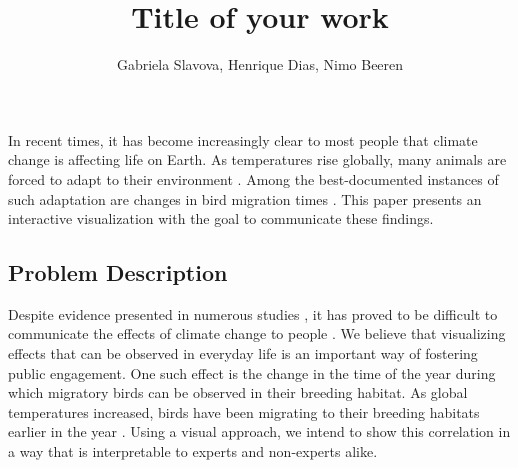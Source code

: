 \documentclass[journal]{vgtc}                %
\title{Title of your work}
\author{Gabriela Slavova, Henrique Dias, Nimo Beeren}
\begin{document}


\maketitle


In recent times, it has become increasingly clear to most people that climate change is affecting life on Earth. As temperatures rise globally, many animals are forced to adapt to their environment \cite{parmesan2007pheno,gaughan2009domestic}. Among the best-documented instances of such adaptation are changes in bird migration times \cite{miller2008bird,visser2008climate,jenni2003timing}. This paper presents an interactive visualization with the goal to communicate these findings.

\subsection{Problem Description}


Despite evidence presented in numerous studies \cite{solomon2007climate,parry2007climate}, it has proved to be difficult to communicate the effects of climate change to people \cite{lee2015predictors,brulle2012shifting,moser2011communicating}. We believe that visualizing effects that can be observed in everyday life is an important way of fostering public engagement. One such effect is the change in the time of the year during which migratory birds can be observed in their breeding habitat. As global temperatures increased, birds have been migrating to their breeding habitats earlier in the year \cite{cotton2003avian,huppop2003north,marra2005influence}. Using a visual approach, we intend to show this correlation in a way that is interpretable to experts and non-experts alike.
\end{document}
